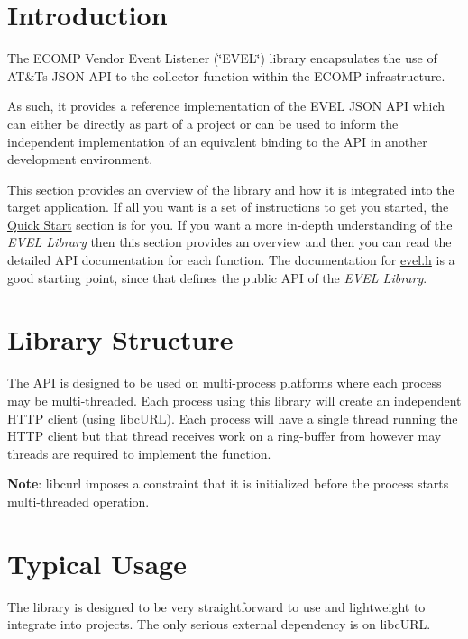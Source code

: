 \section*{Introduction}

The E\+C\+O\+M\+P Vendor Event Listener (\char`\"{}\+E\+V\+E\+L\char`\"{}) library encapsulates the use of A\+T\&T\textquotesingle{}s J\+S\+O\+N A\+P\+I to the collector function within the E\+C\+O\+M\+P infrastructure.

As such, it provides a reference implementation of the E\+V\+E\+L J\+S\+O\+N A\+P\+I which can either be directly as part of a project or can be used to inform the independent implementation of an equivalent binding to the A\+P\+I in another development environment.

This section provides an overview of the library and how it is integrated into the target application. If all you want is a set of instructions to get you started, the \hyperlink{quickstart}{Quick Start} section is for you. If you want a more in-\/depth understanding of the {\itshape E\+V\+E\+L Library} then this section provides an overview and then you can read the detailed A\+P\+I documentation for each function. The documentation for \hyperlink{evel_8h}{evel.\+h} is a good starting point, since that defines the public A\+P\+I of the {\itshape E\+V\+E\+L Library}.

\section*{Library Structure}

The A\+P\+I is designed to be used on multi-\/process platforms where each process may be multi-\/threaded. Each process using this library will create an independent H\+T\+T\+P client (using libc\+U\+R\+L). Each process will have a single thread running the H\+T\+T\+P client but that thread receives work on a ring-\/buffer from however may threads are required to implement the function.

{\bfseries Note}\+: libcurl imposes a constraint that it is initialized before the process starts multi-\/threaded operation.

\section*{Typical Usage}

The library is designed to be very straightforward to use and lightweight to integrate into projects. The only serious external dependency is on libc\+U\+R\+L.

